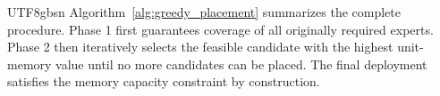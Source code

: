 \documentclass[journal]{IEEEtran}
\begin{document}
\begin{CJK*}{UTF8}{gbsn}
Algorithm~\ref{alg:greedy_placement} summarizes the complete procedure. Phase 1 first guarantees coverage of all originally required experts. Phase 2 then iteratively selects the feasible candidate with the highest unit-memory value until no more candidates can be placed. The final deployment satisfies the memory capacity constraint by construction.











\end{CJK*}
\end{document}
